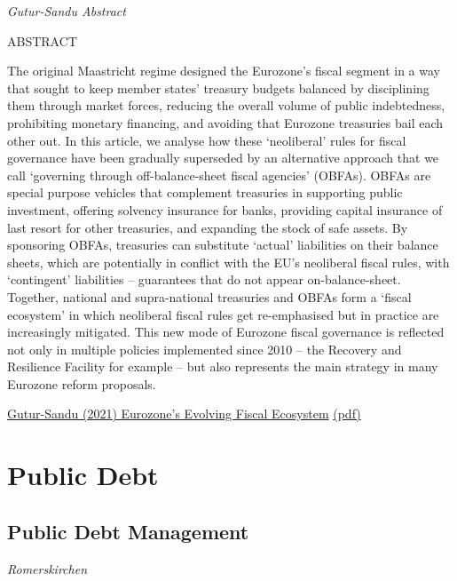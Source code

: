 \documentclass[
]{book}
\begin{document}
\emph{Gutur-Sandu Abstract}

ABSTRACT

The original Maastricht regime designed the Eurozone's fiscal segment in a way that sought to keep member states' treasury budgets balanced by disciplining them through market forces, reducing the overall volume of public indebtedness, prohibiting monetary financing, and avoiding that Eurozone treasuries bail each other out. In this article, we analyse how these `neoliberal' rules for fiscal governance have been gradually superseded by an alternative approach that we call `governing through off-balance-sheet fiscal agencies' (OBFAs). OBFAs are special purpose vehicles that complement treasuries in supporting public investment, offering solvency insurance for banks, providing capital insurance of last resort for other treasuries, and expanding the stock of safe assets. By sponsoring OBFAs, treasuries can substitute `actual' liabilities on their balance sheets, which are potentially in conflict with the EU's neoliberal fiscal rules, with `contingent' liabilities -- guarantees that do not appear on-balance-sheet. Together, national and supra-national treasuries and OBFAs form a `fiscal ecosystem' in which neoliberal fiscal rules get re-emphasised but in practice are increasingly mitigated. This new mode of Eurozone fiscal governance is reflected not only in multiple policies implemented since 2010 -- the Recovery and Resilience Facility for example -- but also represents the main strategy in many Eurozone reform proposals.

\href{https://www.tandfonline.com/doi/full/10.1080/13563467.2021.1910648}{Gutur-Sandu (2021) Eurozone's Evolving Fiscal Ecosystem}
\href{pdf/Gutur-Sandu_2021_Eurozones_evolving_Fiscal_Ecosystem.pdf}{(pdf)}

\hypertarget{public-debt}{%
\chapter{Public Debt}\label{public-debt}}

\hypertarget{public-debt-management}{%
\section{Public Debt Management}\label{public-debt-management}}

\emph{Romerskirchen}
\end{document}
